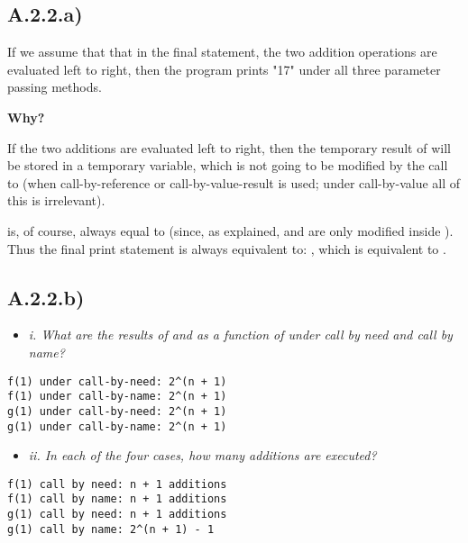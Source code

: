 \subsection{A.2.2.a)}
If we assume that that in the final statement, the two addition operations are
evaluated left to right, then the program prints "17" under all three parameter
passing methods.

\smallskip

\textbf{Why?}

\medskip

If the two additions are evaluated left to right, then the temporary result of
 will be stored in a temporary variable, which is not going to be
modified by the call to  (when call-by-reference or call-by-value-result
is used; under call-by-value all of this is irrelevant). \smallskip

 is, of course, always equal to  (since, as
explained,  and  are only modified inside ). Thus the final
print statement is always equivalent to: , which
is equivalent to .

\sectend

\subsection{A.2.2.b)}


\begin{itemize}
  \item \textit{i. What are the results of  and  as a function
    of  under call by need and call by name?}
\end{itemize}

\begin{verbatim}
f(1) under call-by-need: 2^(n + 1)
f(1) under call-by-name: 2^(n + 1)
g(1) under call-by-need: 2^(n + 1)
g(1) under call-by-name: 2^(n + 1)
\end{verbatim}


\begin{itemize}
  \item \textit{ii. In each of the four cases, how many additions are executed?}
\end{itemize}

\begin{verbatim}
f(1) call by need: n + 1 additions
f(1) call by name: n + 1 additions
g(1) call by need: n + 1 additions
g(1) call by name: 2^(n + 1) - 1
\end{verbatim}

\Sectend

